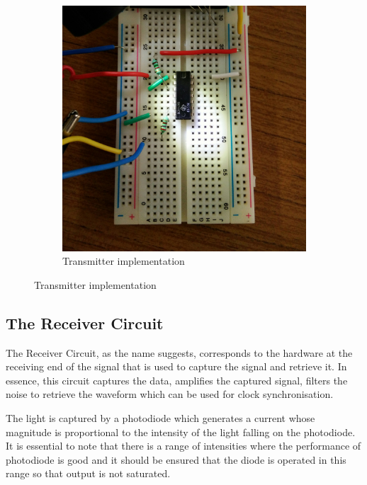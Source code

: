 \documentclass{article}
\begin{document}
\begin{figure}[h]
\begin{subfigure}[t]{0.5\textwidth}
	\centering
	\includegraphics[scale = 0.1]{images/Transmitter.JPG}
	\caption{Transmitter implementation}
	\label{Fig :1b}
\end{subfigure}

\end{figure}



\subsection{The Receiver Circuit}
The Receiver Circuit, as the name suggests, corresponds to the hardware at the receiving end of the signal that is used to capture the signal and retrieve it. In essence, this circuit captures the data, amplifies the captured signal, filters the noise to retrieve the waveform which can be used for clock synchronisation.

The light is captured by a photodiode which generates a current whose magnitude is proportional to the intensity of the light falling on the photodiode. It is essential to note that there is a range of intensities where the performance of photodiode is good and it should be ensured that the diode is operated in this range so that output is not saturated.
\end{document}
